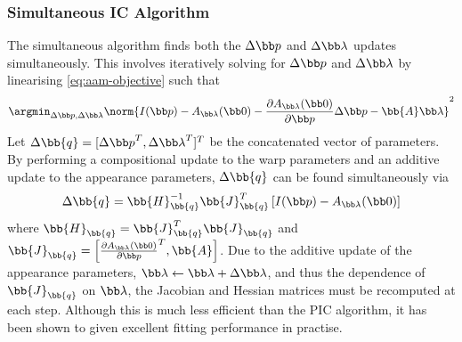 \subsubsection{Simultaneous IC Algorithm}\label{subsec:aam-simultaneous}
The simultaneous algorithm \cite{gross2005generic} finds both the $\Delta \p$ and
$\Delta \blambda$ updates simultaneously. This involves iteratively solving for
$\Delta \p$ and $\Delta \blambda$ by linearising \cref{eq:aam-objective} such
that
\begin{equation}\label{eq:aam-simultaneous-linearise}
    \argmin_{\Delta \p, \Delta \blambda} \norm{I(\p) - A_{\blambda}(\zero) - \frac{\partial A_{\blambda}(\zero)}{\partial \p} \Delta \p - \bb{A} \blambda}^2
\end{equation}
Let $\Delta \bb{q} = [{\Delta \p}^T, {\Delta \blambda}^T]^T$ be the
concatenated vector of parameters. By performing a compositional update to the
warp parameters and an additive update to the appearance parameters, $\Delta
\bb{q}$ can be found simultaneously via
\begin{equation}\label{eq:aam-simultaneous-deltaq-update}
    \Delta \bb{q} = \bb{H}_{\bb{q}}^{-1} \bb{J}_{\bb{q}}^{T} \left[ I(\p) - A_{\blambda}(\zero) \right]
\end{equation}
where $\bb{H}_{\bb{q}} = \bb{J}_{\bb{q}}^{T}
\bb{J}_{\bb{q}}$ and $\bb{J}_{\bb{q}} = \left[
{\frac{\partial A_{\blambda}(\zero)}{\partial \p}}^T, \bb{A} \right]$.
Due to the additive update of the appearance parameters, $\blambda \leftarrow
\blambda + \Delta \blambda$, and thus the dependence of
$\bb{J}_{\bb{q}}$ on $\blambda$, the Jacobian and Hessian
matrices must be recomputed at each step. Although this is much less efficient
than the PIC algorithm, it has been shown to given excellent fitting performance
in practise.
